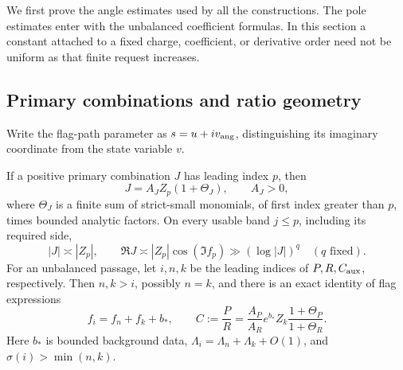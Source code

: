 We first prove the angle estimates used by all the constructions.
The pole estimates enter with the unbalanced coefficient formulas.
In this section a constant attached to a fixed charge,
coefficient, or derivative order need not be uniform as that finite
request increases.

\subsection{Primary combinations and ratio geometry}

Write the flag-path parameter as $s=u+i v_{\rm ang}$, distinguishing
its imaginary coordinate from the state variable $v$.

\begin{lemma}\label{lem:mixed-ratio}
If a positive primary combination $J$ has leading index $p$, then
\begin{equation}\label{eq:mixed-primary}
 J=A_JZ_p(1+\Theta_J),\qquad A_J>0,
\end{equation}
where $\Theta_J$ is a finite sum of strict-small monomials, of first
index greater than $p$, times bounded analytic factors. On every
usable band $j\leq p$, including its required side,
\begin{equation}\label{eq:mixed-primary-real}
 |J|\asymp |Z_p|,\qquad
 \Re J\asymp |Z_p|\cos(\Im f_p)\gg(\log|J|)^q
 \quad(q\text{ fixed}).
\end{equation}
For an unbalanced passage, let $i,n,k$ be the leading indices of
$P,R,C_{\rm aux}$, respectively. Then $n,k>i$, possibly $n=k$, and
there is an exact identity of flag expressions
\begin{equation}\label{eq:mixed-log-tie}
 f_i=f_n+f_k+b_*,\qquad
 C:=\frac PR=\frac{A_P}{A_R}e^{b_*}Z_k
                  \frac{1+\Theta_P}{1+\Theta_R}.
\end{equation}
Here $b_*$ is bounded background data, $\Lambda_i=\Lambda_n+\Lambda_k+O(1)$,
and $\sigma(i)>\min(n,k)$.


\end{lemma}
